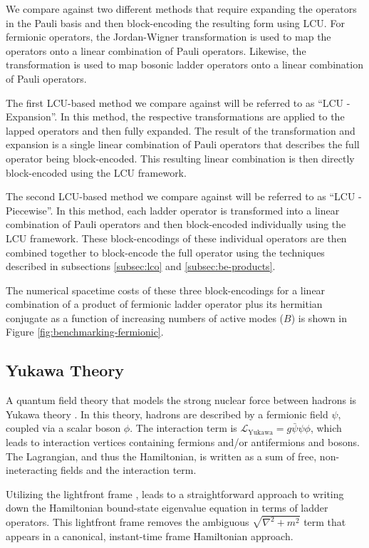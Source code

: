 We compare against two different methods that require expanding the operators in the Pauli basis and then block-encoding the resulting form using LCU.
For fermionic operators, the Jordan-Wigner transformation \cite{} is used to map the operators onto a linear combination of Pauli operators.
Likewise, the  transformation \cite{} is used to map bosonic ladder operators onto a linear combination of Pauli operators.

The first LCU-based method we compare against will be referred to as ``LCU - Expansion''.
In this method, the respective transformations are applied to the lapped operators and then fully expanded.
The result of the transformation and expansion is a single linear combination of Pauli operators that describes the full operator being block-encoded.
This resulting linear combination is then directly block-encoded using the LCU framework.

The second LCU-based method we compare against will be referred to as ``LCU - Piecewise''.
In this method, each ladder operator is transformed into a linear combination of Pauli operators and then block-encoded individually using the LCU framework.
These block-encodings of these individual operators are then combined together to block-encode the full operator using the techniques described in subsections \ref{subsec:lco} and \ref{subsec:be-products}.

The numerical spacetime costs of these three block-encodings for a linear combination of a product of fermionic ladder operator plus its hermitian conjugate as a function of increasing numbers of active modes ($B$) is shown in Figure \ref{fig:benchmarking-fermionic}.



\subsection{Yukawa Theory}
A quantum field theory that models the strong nuclear force between hadrons is Yukawa theory \cite{Peskin:1995ev}. In this theory, hadrons are described by a fermionic field $\psi$, coupled via a scalar boson $\phi$. The interaction term is $\mathcal{L}_{\text{Yukawa}} = g\bar\psi \psi \phi$, which leads to interaction vertices containing fermions and/or antifermions and bosons. The Lagrangian, and thus the Hamiltonian, is written as a sum of free, non-ineteracting fields and the interaction term.

Utilizing the lightfront frame \cite{Dirac1949}, leads to a straightforward approach to writing down the Hamiltonian bound-state eigenvalue equation in terms of ladder operators. This lightfront frame removes the ambiguous $\sqrt{\nabla^2 + m^2}$ term that appears in a canonical, instant-time frame Hamiltonian approach. 

